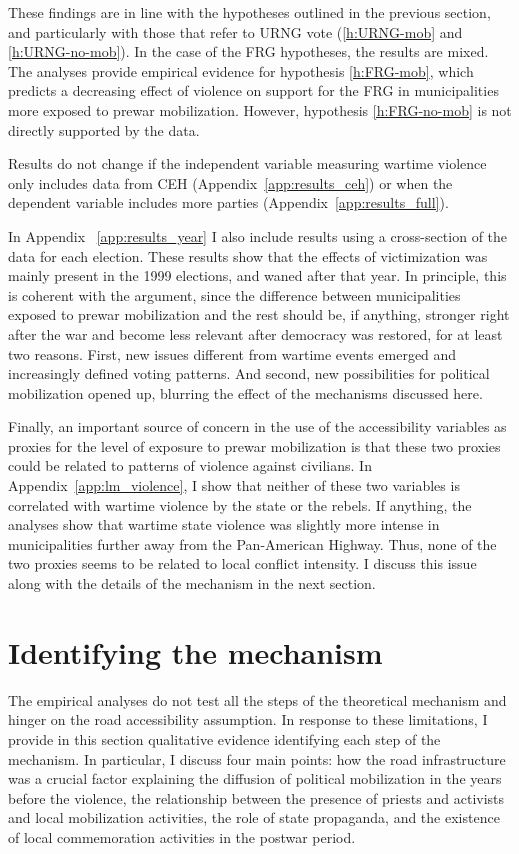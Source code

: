 \documentclass[12pt, notitlepage]{article}
\begin{document}
These findings are in line with the hypotheses outlined in the previous section, and particularly with those that refer to URNG vote (\ref{h:URNG-mob} and \ref{h:URNG-no-mob}).
In the case of the FRG hypotheses, the results are mixed.
The analyses provide empirical evidence for hypothesis \ref{h:FRG-mob}, which predicts a decreasing effect of violence on support for the FRG in municipalities more exposed to prewar mobilization.
However, hypothesis \ref{h:FRG-no-mob} is not directly supported by the data.

Results do not change if the independent variable measuring wartime violence only includes data from CEH (Appendix~\ref{app:results_ceh}) or when the dependent variable includes more parties (Appendix~\ref{app:results_full}).

In Appendix ~\ref{app:results_year} I also include results using a cross-section of the data for each election.
These results show that the effects of victimization was mainly present in the 1999 elections, and waned after that year.
In principle, this is coherent with the argument, since the difference between municipalities exposed to prewar mobilization and the rest should be, if anything, stronger right after the war and become less relevant after democracy was restored, for at least two reasons.
First, new issues different from wartime events emerged and increasingly defined voting patterns.
And second, new possibilities for political mobilization opened up, blurring the effect of the mechanisms discussed here.

Finally, an important source of concern in the use of the accessibility variables as proxies for the level of exposure to prewar mobilization is that these two proxies could be related to patterns of violence against civilians.
In Appendix~\ref{app:lm_violence}, I show that neither of these two variables is correlated with wartime violence by the state or the rebels.
If anything, the analyses show that wartime state violence was slightly more intense in municipalities further away from the Pan-American Highway.
Thus, none of the two proxies seems to be related to local conflict intensity.
I discuss this issue along with the details of the mechanism in the next section.

\section*{Identifying the mechanism}\label{sec:mechanism}

The empirical analyses do not test all the steps of the theoretical mechanism and hinger on the road accessibility assumption.
In response to these limitations, I provide in this section qualitative evidence identifying each step of the mechanism.
In particular, I discuss four main points: how the road infrastructure was a crucial factor explaining the diffusion of political mobilization in the years before the violence, the relationship between the presence of priests and activists and local mobilization activities, the role of state propaganda, and the existence of local commemoration activities in the postwar period.
\end{document}
